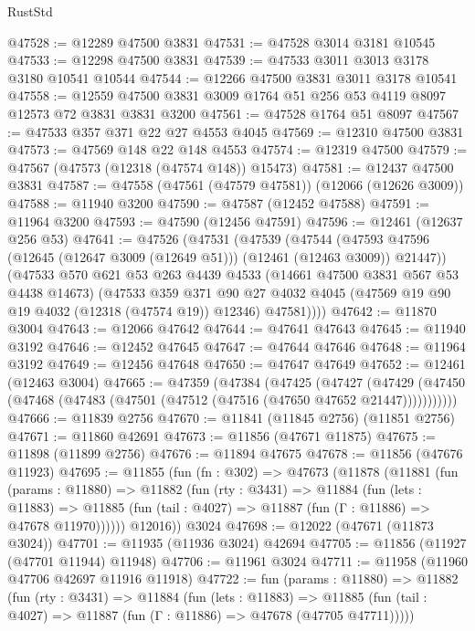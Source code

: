 \begin{lexlean}{RustStd}
\begin{coremodule}
@47528 := @12289 @47500 @3831
@47531 := @47528 @3014 @3181 @10545
@47533 := @12298 @47500 @3831
@47539 := @47533 @3011 @3013 @3178 @3180 @10541 @10544
@47544 := @12266 @47500 @3831 @3011 @3178 @10541
@47558 := @12559 @47500 @3831 @3009 @1764 @51 @256 @53 @4119 @8097 @12573 @72 @3831 @3831 @3200
@47561 := @47528 @1764 @51 @8097
@47567 := @47533 @357 @371 @22 @27 @4553 @4045
@47569 := @12310 @47500 @3831
@47573 := @47569 @148 @22 @148 @4553
@47574 := @12319 @47500
@47579 := @47567 (@47573 (@12318 (@47574 @148)) @15473)
@47581 := @12437 @47500 @3831
@47587 := @47558 (@47561 (@47579 @47581)) (@12066 (@12626 @3009))
@47588 := @11940 @3200
@47590 := @47587 (@12452 @47588)
@47591 := @11964 @3200
@47593 := @47590 (@12456 @47591)
@47596 := @12461 (@12637 @256 @53)
@47641 := @47526
    (@47531
      (@47539
        (@47544 (@47593 @47596 (@12645 (@12647 @3009 (@12649 @51))) (@12461 (@12463 @3009)) @21447))
        (@47533
          @570
          @621
          @53
          @263
          @4439
          @4533
          (@14661 @47500 @3831 @567 @53 @4438 @14673)
          (@47533
            @359
            @371
            @90
            @27
            @4032
            @4045
            (@47569 @19 @90 @19 @4032 (@12318 (@47574 @19)) @12346)
            @47581))))
@47642 := @11870 @3004
@47643 := @12066 @47642
@47644 := @47641 @47643
@47645 := @11940 @3192
@47646 := @12452 @47645
@47647 := @47644 @47646
@47648 := @11964 @3192
@47649 := @12456 @47648
@47650 := @47647 @47649
@47652 := @12461 (@12463 @3004)
@47665 := @47359
    (@47384
      (@47425
        (@47427
          (@47429 (@47450 (@47468 (@47483 (@47501 (@47512 (@47516 (@47650 @47652 @21447)))))))))))
@47666 := @11839 @2756
@47670 := @11841 (@11845 @2756) (@11851 @2756)
@47671 := @11860 @42691
@47673 := @11856 (@47671 @11875)
@47675 := @11898 (@11899 @2756)
@47676 := @11894 @47675
@47678 := @11856 (@47676 @11923)
@47695 := @11855
    (fun (fn : @302) =>
    @47673
      (@11878
        (@11881
          (fun (params : @11880) =>
          @11882
            (fun (rty : @3431) =>
            @11884
              (fun (lets : @11883) =>
              @11885 (fun (tail : @4027) => @11887 (fun (Γ : @11886) => @47678 @11970))))))
        @12016))
    @3024
@47698 := @12022 (@47671 (@11873 @3024))
@47701 := @11935 (@11936 @3024) @42694
@47705 := @11856 (@11927 (@47701 @11944) @11948)
@47706 := @11961 @3024
@47711 := @11958 (@11960 @47706 @42697 @11916 @11918)
@47722 := fun (params : @11880) =>
  @11882
    (fun (rty : @3431) =>
    @11884
      (fun (lets : @11883) =>
      @11885 (fun (tail : @4027) => @11887 (fun (Γ : @11886) => @47678 (@47705 @47711)))))

\end{coremodule}
\end{lexlean}
